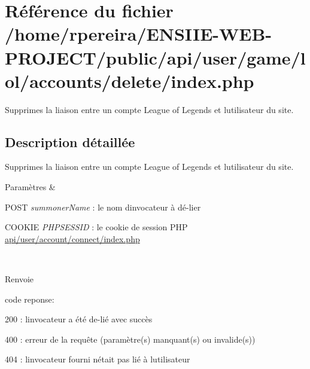 \hypertarget{game_2lol_2accounts_2delete_2index_8php}{}\section{Référence du fichier /home/rpereira/\+E\+N\+S\+I\+I\+E-\/\+W\+E\+B-\/\+P\+R\+O\+J\+E\+C\+T/public/api/user/game/lol/accounts/delete/index.php}
\label{game_2lol_2accounts_2delete_2index_8php}


Supprimes la liaison entre un compte League of Legends et l\textquotesingle{}utilisateur du site.  




\subsection{Description détaillée}
Supprimes la liaison entre un compte League of Legends et l\textquotesingle{}utilisateur du site. 


\begin{DoxyParams}{Paramètres}
{\em } & 
\begin{DoxyItemize}
\item P\+O\+ST {\itshape summoner\+Name} \+: le nom d\textquotesingle{}invocateur à dé-\/lier
\item C\+O\+O\+K\+IE {\itshape P\+H\+P\+S\+E\+S\+S\+ID} \+: le cookie de session P\+HP \hyperlink{account_2connect_2index_8php}{api/user/account/connect/index.\+php} 
\end{DoxyItemize}\\
\hline
\end{DoxyParams}
\begin{DoxyReturn}{Renvoie}

\begin{DoxyItemize}
\item code reponse\+:
\begin{DoxyItemize}
\item 200 \+: l\textquotesingle{}invocateur a été de-\/lié avec succès
\item 400 \+: erreur de la requête (paramètre(s) manquant(s) ou invalide(s))
\item 404 \+: l\textquotesingle{}invocateur fourni n\textquotesingle{}était pas lié à l\textquotesingle{}utilisateur 
\end{DoxyItemize}
\end{DoxyItemize}
\end{DoxyReturn}
